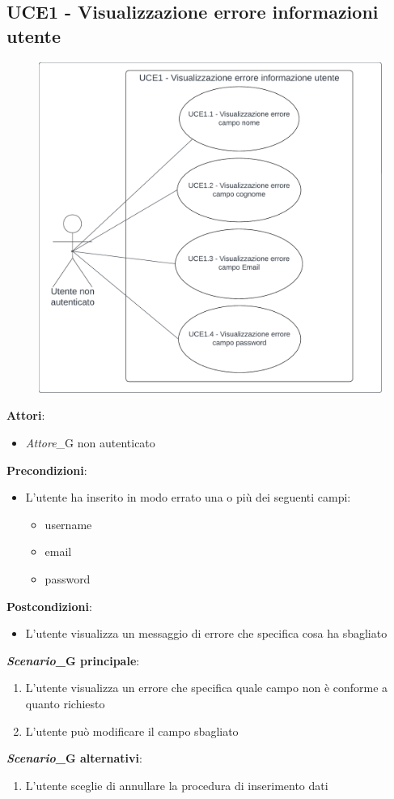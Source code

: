 \subsection{UCE1 - Visualizzazione errore informazioni utente}\label{usecase:e_1}
\begin{figure}[H]
    \centering
    \includegraphics[width=0.75\linewidth]{ucd/UCED1.png}
\end{figure}
\textbf{Attori}:
\begin{itemize}
    \item \textit{Attore}_G non autenticato
\end{itemize}
\textbf{Precondizioni}:
\begin{itemize}
    \item L'utente ha inserito in modo errato una o più dei seguenti campi:
    \begin{itemize}
        \item username
        \item email
        \item password
    \end{itemize}
\end{itemize}
\textbf{Postcondizioni}:
\begin{itemize}
    \item L'utente visualizza un messaggio di errore che specifica cosa ha sbagliato
\end{itemize}
\textbf{\textit{Scenario}_G principale}:
\begin{enumerate}
    \item L'utente visualizza un errore che specifica quale campo non è conforme a quanto richiesto
    \item L'utente può modificare il campo sbagliato
\end{enumerate}
\textbf{\textit{Scenario}_G alternativi}:
\begin{enumerate}
    \item L'utente sceglie di annullare la procedura di inserimento dati
\end{enumerate}




\newpage